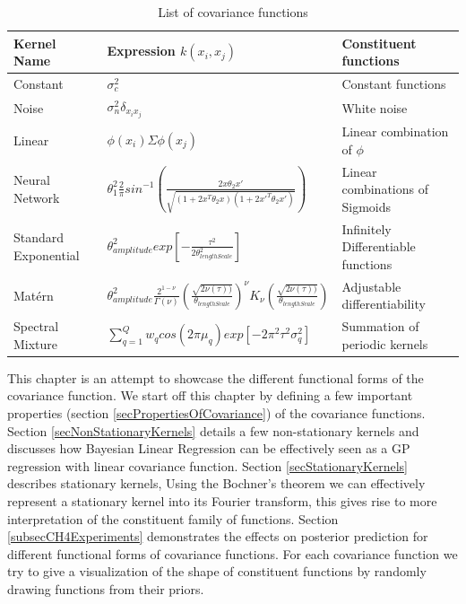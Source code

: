 \begin{table}[!ht]
    \centering
\begin{tabularx}{\textwidth}{|l|l|X|}
  \hline
Kernel Name  & Expression $k(x_{i}, x_{j})$ & Constituent functions \\
  \hline 
  \hline
Constant & \small $\sigma_{c}^2$ & Constant functions \normalsize\\
Noise & \small $\sigma_{n}^2\delta_{x_{i}x_{j}}$ & White noise \normalsize\\
Linear & \small $\phi(x_{i})\Sigma\phi(x_{j})$ & Linear combination of $\phi$ \normalsize\\
Neural Network & \small $\theta_{1}^{2}\frac{2}{\pi} sin^{-1}\left ( \frac{2x\theta_{2}x'}{\sqrt{(1+2x^{T}\theta_{2}x)(1+2x'^{T}\theta_{2}x')}} \right )$ & Linear combinations of Sigmoids \normalsize\\
Standard Exponential & \small $\theta_{amplitude}^2exp[-\frac{\tau^2}{2\theta_{lengthScale}^2}]$ & Infinitely Differentiable functions \normalsize\\ 
Mat\'ern & \small $\theta_{amplitude}^2\frac{2^{1- \nu }}{\Gamma (\nu)}\left ( \frac{\sqrt{2\nu(\tau))}}{\theta_{lengthScale}} \right )^{\nu}K_{\nu}\left ( \frac{\sqrt{2\nu(\tau))}}{\theta_{lengthScale}} \right)$ & Adjustable differentiability \normalsize\\
Spectral Mixture & \small  $\sum_{q=1}^{Q}w_{q}cos(2\pi\mu_{q}) exp[-2\pi^{2}\tau^{2}\sigma_{q}^2]$ & Summation of periodic kernels \normalsize\\
   \hline
\end{tabularx}
  \label{tabListOfCovarianceFUnctions}
  \caption{List of covariance functions}
  \end{table}
  
This chapter is an attempt to showcase the different functional forms of the covariance function. We start off this chapter by defining a few important properties (section \ref{secPropertiesOfCovariance}) of the covariance functions. Section \ref{secNonStationaryKernels} details a few non-stationary kernels and discusses how Bayesian Linear Regression can be effectively seen as a GP regression with linear covariance function. Section \ref{secStationaryKernels} describes stationary kernels, Using the Bochner's theorem we can effectively represent a stationary kernel into its Fourier transform, this gives rise to more interpretation of the constituent family of functions. Section \ref{subsecCH4Experiments} demonstrates the effects on posterior prediction for different functional forms of covariance functions. For each covariance function we try to give a visualization of the shape of constituent functions by randomly drawing functions from their priors. 

